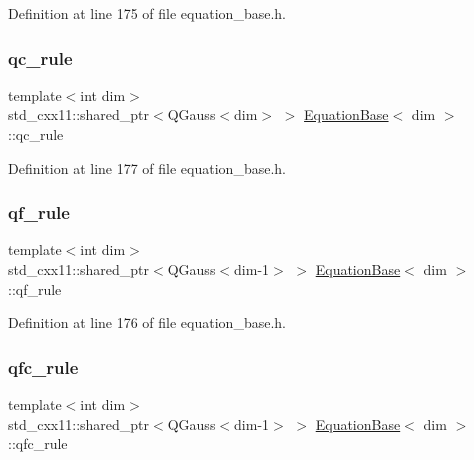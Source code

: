 Definition at line 175 of file equation\+\_\+base.\+h.

\mbox{\label{class_equation_base_a306b0c876f50b5eb936e5bf71ebcd988}} 
\subsubsection{\texorpdfstring{qc\+\_\+rule}{qc\_rule}}
{\footnotesize\ttfamily template$<$int dim$>$ \\
std\+\_\+cxx11\+::shared\+\_\+ptr$<$Q\+Gauss$<$dim$>$ $>$ \hyperlink{class_equation_base}{Equation\+Base}$<$ dim $>$\+::qc\+\_\+rule\hspace{0.3cm}{\ttfamily [protected]}}



Definition at line 177 of file equation\+\_\+base.\+h.

\mbox{\label{class_equation_base_ab4c9256889d7f5a6b7d4295c81b9193b}} 
\subsubsection{\texorpdfstring{qf\+\_\+rule}{qf\_rule}}
{\footnotesize\ttfamily template$<$int dim$>$ \\
std\+\_\+cxx11\+::shared\+\_\+ptr$<$Q\+Gauss$<$dim-\/1$>$ $>$ \hyperlink{class_equation_base}{Equation\+Base}$<$ dim $>$\+::qf\+\_\+rule\hspace{0.3cm}{\ttfamily [protected]}}



Definition at line 176 of file equation\+\_\+base.\+h.

\mbox{\label{class_equation_base_a867f14c44c6132bd65542e9cdcf264c4}} 
\subsubsection{\texorpdfstring{qfc\+\_\+rule}{qfc\_rule}}
{\footnotesize\ttfamily template$<$int dim$>$ \\
std\+\_\+cxx11\+::shared\+\_\+ptr$<$Q\+Gauss$<$dim-\/1$>$ $>$ \hyperlink{class_equation_base}{Equation\+Base}$<$ dim $>$\+::qfc\+\_\+rule\hspace{0.3cm}{\ttfamily [protected]}}



